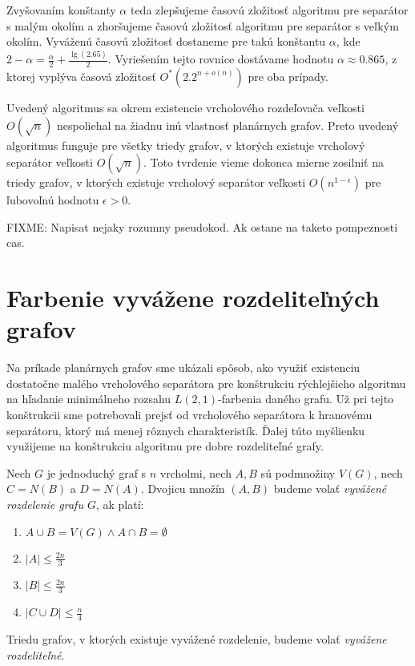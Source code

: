 Zvyšovaním konštanty $\alpha$ teda zlepšujeme časovú zložitosť algoritmu pre separátor s malým
okolím a zhoršujeme časovú zložitosť algoritmu pre separátor s veľkým okolím. Vyváženú časovú
zložitosť dostaneme pre takú konštantu $\alpha$, kde $2 - \alpha = \frac{\alpha}{2} + \frac{\lg(2.65)}{2}$.
Vyriešením tejto rovnice dostávame hodnotu $\alpha \approx 0.865$, z ktorej vyplýva časová zložitosť
$O^*(2.2^{n + o(n)})$ pre oba prípady.

Uvedený algoritmus sa okrem existencie vrcholového rozdeľovača veľkosti $O(\sqrt{n})$ nespoliehal
na žiadnu inú vlastnosť planárnych grafov. Preto uvedený algoritmus funguje pre všetky triedy grafov,
v ktorých existuje vrcholový separátor veľkosti $O(\sqrt{n})$. Toto tvrdenie vieme dokonca mierne
zosilniť na triedy grafov, v ktorých existuje vrcholový separátor veľkosti $O(n^{1 - \epsilon})$ pre
ľubovoľnú hodnotu $\epsilon > 0$.

FIXME: Napisat nejaky rozumny pseudokod. Ak ostane na taketo pompeznosti cas.

\section{Farbenie vyvážene rozdeliteľných grafov}

Na príkade planárnych grafov sme ukázali spôsob, ako využiť existenciu dostatočne malého vrcholového
separátora pre konštrukciu rýchlejšieho algoritmu na hľadanie minimálneho rozsahu $L(2,1)$-farbenia
daného grafu. Už pri tejto konštrukcii sme potrebovali prejsť od vrcholového separátora k hranovému
separátoru, ktorý má menej rôznych charakteristík. Ďalej túto myšlienku využijeme na konštrukciu
algoritmu pre dobre rozdeliteľné grafy.

\begin{defn}
    Nech $G$ je jednoduchý graf s $n$ vrcholmi, nech $A, B$ sú podmnožiny $V(G)$,
    nech $C = N(B)$ a $D = N(A)$. Dvojicu množín $(A,B)$ budeme volať \emph{vyvážené rozdelenie
    grafu $G$}, ak platí:
    \begin{enumerate}
        \item $A \cup B = V(G) \wedge A \cap B = \emptyset$
        \item $|A| \leq \frac{2n}{3}$
        \item $|B| \leq \frac{2n}{3}$
        \item $|C \cup D| \leq \frac{n}{4}$
    \end{enumerate}

    Triedu grafov, v ktorých existuje vyvážené rozdelenie, budeme volať \emph{vyvážene rozdeliteľné}.
\end{defn}


